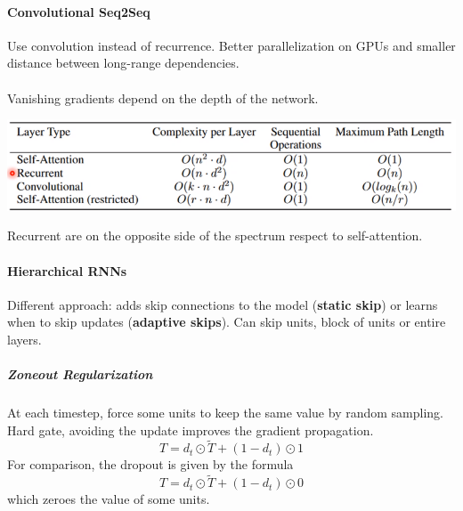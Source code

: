 \documentclass[10pt]{report}
\begin{document}
\paragraph{Convolutional Seq2Seq} Use convolution instead of recurrence. Better parallelization on GPUs and smaller distance between long-range dependencies.\\\\
Vanishing gradients depend on the depth of the network.
\begin{center}
	\includegraphics[scale=0.5]{121.png}
\end{center}
Recurrent are on the opposite side of the spectrum respect to self-attention.
\paragraph{Hierarchical RNNs} Different approach: adds skip connections to the model (\textbf{static skip}) or learns when to skip updates (\textbf{adaptive skips}). Can skip units, block of units or entire layers.
\subparagraph{Zoneout Regularization} At each timestep, force some units to keep the same value by random sampling. Hard gate, avoiding the update improves the gradient propagation.
$$T = d_t\odot \tilde{T}+(1-d_t)\odot 1$$
For comparison, the dropout is given by the formula
$$T = d_t\odot\tilde{T}+(1-d_t)\odot 0$$
which zeroes the value of some units.
\end{document}
